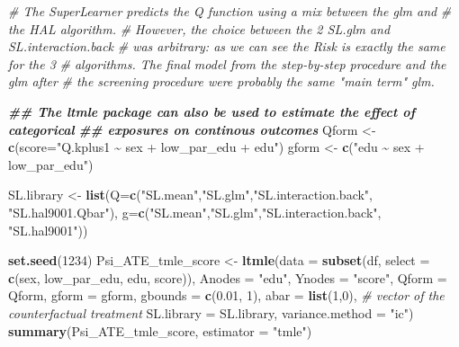 \documentclass[
]{book}
\newenvironment{Shaded}{\begin{snugshade}}{\end{snugshade}}
\newcommand{\AttributeTok}[1]{\textcolor[rgb]{0.13,0.29,0.53}{#1}}
\newcommand{\CommentTok}[1]{\textcolor[rgb]{0.56,0.35,0.01}{\textit{#1}}}
\newcommand{\DecValTok}[1]{\textcolor[rgb]{0.00,0.00,0.81}{#1}}
\newcommand{\DocumentationTok}[1]{\textcolor[rgb]{0.56,0.35,0.01}{\textbf{\textit{#1}}}}
\newcommand{\FloatTok}[1]{\textcolor[rgb]{0.00,0.00,0.81}{#1}}
\newcommand{\FunctionTok}[1]{\textcolor[rgb]{0.13,0.29,0.53}{\textbf{#1}}}
\newcommand{\NormalTok}[1]{#1}
\newcommand{\OtherTok}[1]{\textcolor[rgb]{0.56,0.35,0.01}{#1}}
\newcommand{\StringTok}[1]{\textcolor[rgb]{0.31,0.60,0.02}{#1}}
\begin{document}
\begin{Shaded}
\begin{Highlighting}[]
\CommentTok{\# The SuperLearner predicts the Q function using a mix between the glm and }
\CommentTok{\# the HAL algorithm. }
\CommentTok{\# However, the choice between the 2 SL.glm and SL.interaction.back }
\CommentTok{\# was arbitrary: as we can see the Risk is exactly the same for the 3 }
\CommentTok{\# algorithms. The final model from the step{-}by{-}step procedure and the glm after}
\CommentTok{\# the screening procedure were probably the same "main term" glm.}


\DocumentationTok{\#\# The \textasciigrave{}ltmle\textasciigrave{} package can also be used to estimate the effect of categorical }
\DocumentationTok{\#\# exposures on continous outcomes}
\NormalTok{Qform }\OtherTok{\textless{}{-}} \FunctionTok{c}\NormalTok{(}\AttributeTok{score=}\StringTok{"Q.kplus1 \textasciitilde{} sex + low\_par\_edu + edu"}\NormalTok{)}
\NormalTok{gform }\OtherTok{\textless{}{-}} \FunctionTok{c}\NormalTok{(}\StringTok{"edu \textasciitilde{} sex + low\_par\_edu"}\NormalTok{)}

\NormalTok{SL.library }\OtherTok{\textless{}{-}} \FunctionTok{list}\NormalTok{(}\AttributeTok{Q=}\FunctionTok{c}\NormalTok{(}\StringTok{"SL.mean"}\NormalTok{,}\StringTok{"SL.glm"}\NormalTok{,}\StringTok{"SL.interaction.back"}\NormalTok{, }\StringTok{"SL.hal9001.Qbar"}\NormalTok{),}
                   \AttributeTok{g=}\FunctionTok{c}\NormalTok{(}\StringTok{"SL.mean"}\NormalTok{,}\StringTok{"SL.glm"}\NormalTok{,}\StringTok{"SL.interaction.back"}\NormalTok{, }\StringTok{"SL.hal9001"}\NormalTok{))}

\FunctionTok{set.seed}\NormalTok{(}\DecValTok{1234}\NormalTok{)}
\NormalTok{Psi\_ATE\_tmle\_score }\OtherTok{\textless{}{-}} \FunctionTok{ltmle}\NormalTok{(}\AttributeTok{data =} \FunctionTok{subset}\NormalTok{(df, }
                                          \AttributeTok{select =} \FunctionTok{c}\NormalTok{(sex, low\_par\_edu,}
\NormalTok{                                                     edu,}
\NormalTok{                                                     score)),}
                      \AttributeTok{Anodes =} \StringTok{"edu"}\NormalTok{,}
                      \AttributeTok{Ynodes =} \StringTok{"score"}\NormalTok{,}
                      \AttributeTok{Qform =}\NormalTok{ Qform,}
                      \AttributeTok{gform =}\NormalTok{ gform,}
                      \AttributeTok{gbounds =} \FunctionTok{c}\NormalTok{(}\FloatTok{0.01}\NormalTok{, }\DecValTok{1}\NormalTok{),}
                      \AttributeTok{abar =} \FunctionTok{list}\NormalTok{(}\DecValTok{1}\NormalTok{,}\DecValTok{0}\NormalTok{), }\CommentTok{\# vector of the counterfactual treatment }
                      \AttributeTok{SL.library =}\NormalTok{ SL.library,}
                      \AttributeTok{variance.method =} \StringTok{"ic"}\NormalTok{)}
\FunctionTok{summary}\NormalTok{(Psi\_ATE\_tmle\_score, }\AttributeTok{estimator =} \StringTok{"tmle"}\NormalTok{)}
\end{Highlighting}
\end{Shaded}
\end{document}
